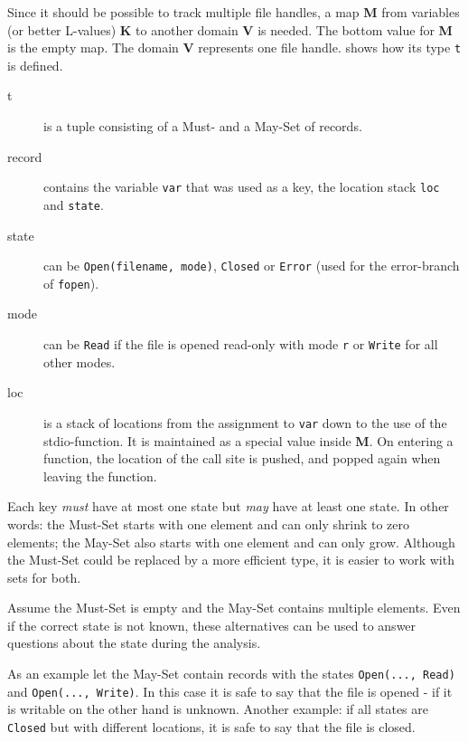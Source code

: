 Since it should be possible to track multiple file handles, a map \textbf{M} from variables (or better L-values) \textbf{K} to another domain \textbf{V} is needed. The bottom value for \textbf{M} is the empty map.
The domain \textbf{V} represents one file handle.  shows how its type \verb|t| is defined.
\begin{description}
\item[t] is a tuple consisting of a Must- and a May-Set of records.

\item[record] contains the variable \verb|var| that was used as a key, the location stack \verb|loc| and \verb|state|.

\item[state] can be \verb|Open(filename, mode)|, \verb|Closed| or \verb|Error| (used for the error-branch of \verb|fopen|).

\item[mode] can be \verb|Read| if the file is opened read-only with mode \verb|r| or \verb|Write| for all other modes.

\item[loc] is a stack of locations from the assignment to \verb|var| down to the use of the stdio-function. It is maintained as a special value inside \textbf{M}. On entering a function, the location of the call site is pushed, and popped again when leaving the function.
\end{description}
Each key \textit{must} have at most one state but \textit{may} have at least one state.
In other words: the Must-Set starts with one element and can only shrink to zero elements; the May-Set also starts with one element and can only grow.
Although the Must-Set could be replaced by a more efficient type, it is easier to work with sets for both.

Assume the Must-Set is empty and the May-Set contains multiple elements. Even if the correct state is not known, these alternatives can be used to answer questions about the state during the analysis.

As an example let the May-Set contain records with the states \verb|Open(..., Read)| and \verb|Open(..., Write)|. In this case it is safe to say that the file is opened - if it is writable on the other hand is unknown. Another example: if all states are \verb|Closed| but with different locations, it is safe to say that the file is closed. %

